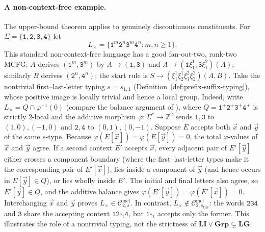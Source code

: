 \documentclass[11pt]{article}
\numberwithin{equation}{section}
\theoremstyle{plain}
\theoremstyle{definition}
\theoremstyle{remark}
\newcommand{\Cmcf}[2]{\mathcal{C}^{\mathrm{mcf}}_{#1,#2}}
\newcommand{\tuple}[1]{\vec{#1}}
\newcommand{\blank}{\square}
\theoremstyle{plain}
\begin{document}
\paragraph{A non-context-free example.}
The upper-bound theorem applies to genuinely discontinuous
constituents.  For $\Sigma=\{\mathtt1,\mathtt2,\mathtt3,\mathtt4\}$ let
\[
 L_\times=\{\mathtt1^m\mathtt2^n\mathtt3^m\mathtt4^n:m,n\ge1\}.
\]
This standard non-context-free language has a good fan-out-two,
rank-two MCFG: $A$ derives $(\mathtt1^m,\mathtt3^m)$ by
$A\to(\mathtt1,\mathtt3)$ and
$A\to(\mathtt1\xi_1^1,\mathtt3\xi_1^2)(A)$;
similarly $B$ derives $(\mathtt2^n,\mathtt4^n)$; the start
rule is $S\to(\xi_1^1\xi_2^1\xi_1^2\xi_2^2)(A,B)$.
Take the nontrivial first--last-letter typing
$s=s_{1,1}$ (Definition~\ref{def:prefix-suffix-typing}),
whose positive image is locally trivial and hence a local group.
Indeed, write $L_\times=Q\cap\varphi^{-1}(0)$ (compare the
balance argument of \cite[Proposition~3.1]{KuriyamaMCFGpreprint}), where
$Q=\mathtt1^+\mathtt2^+\mathtt3^+\mathtt4^+$ is strictly $2$-local
and the additive morphism $\varphi:\Sigma^*\to\mathbb Z^2$
sends $\mathtt1,\mathtt3$ to $(1,0),(-1,0)$ and
$\mathtt2,\mathtt4$ to $(0,1),(0,-1)$.
Suppose $E$ accepts both $\tuple x$ and $\tuple y$ of the same
$s$-type.  Because $\varphi(E[\tuple x])=\varphi(E[\tuple y])=0$,
the total $\varphi$-values of $\tuple x$ and $\tuple y$ agree.
If a second context $E'$ accepts $\tuple x$, every adjacent pair
of $E'[\tuple y]$ either crosses a component boundary (where the
first--last-letter types make it the corresponding pair of
$E'[\tuple x]$), lies inside a component of $\tuple y$ (and hence
occurs in $E[\tuple y]\in Q$), or lies wholly inside $E'$.
The initial and final letters also agree, so
$E'[\tuple y]\in Q$, and the additive balance gives
$\varphi(E'[\tuple y])=\varphi(E'[\tuple x])=0$.
Interchanging $\tuple x$ and $\tuple y$ proves
$L_\times\in\Cmcf{2}{s}$.
In contrast, $L_\times\notin\Cmcf{2}{s_{\mathrm{triv}}}$:
the words $\mathtt{234}$ and $\mathtt3$ share the accepting context
$\mathtt{12}\blank_1\mathtt4$, but
$\mathtt1\blank_1$ accepts only the former.
This illustrates the role of a nontrivial typing, not the
strictness of $\mathbf{LI}\vee\mathbf{Grp}\subsetneq\mathbf{LG}$.
\end{document}
